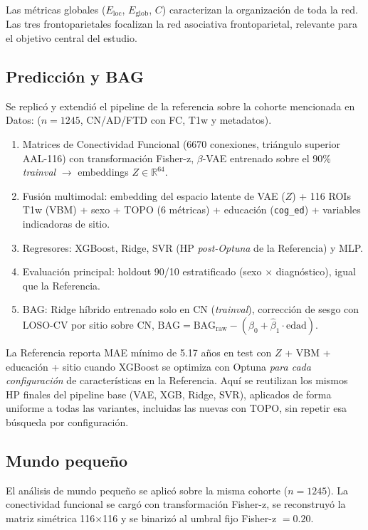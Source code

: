 \documentclass[12pt,a4paper]{article}
\begin{document}
Las métricas globales ($E_{\text{loc}}$, $E_{\text{glob}}$, $C$) caracterizan la organización de toda la red. Las tres frontoparietales focalizan la red asociativa frontoparietal, relevante para el objetivo central del estudio.

\subsection{Predicción y BAG}

Se replicó y extendió el pipeline de la referencia\cite{bazan2026} sobre la cohorte mencionada en Datos: ($n = 1245$, CN/AD/FTD con FC, T1w y metadatos).

\begin{enumerate}
  \item Matrices de Conectividad Funcional (6670 conexiones, triángulo superior AAL-116\cite{tzourio2002}) con transformación Fisher-z, $\beta$-VAE\cite{higgins2022} entrenado sobre el 90\% \emph{trainval} $\rightarrow$ embeddings $Z \in \mathbb{R}^{64}$.
  \item Fusión multimodal: embedding del espacio latente de VAE ($Z$) + 116 ROIs T1w (VBM) + sexo + TOPO (6 métricas) + educación (\texttt{cog\_ed}) + variables indicadoras de sitio.
  \item Regresores: XGBoost, Ridge, SVR (HP \emph{post-Optuna} de la Referencia) y MLP.
  \item Evaluación principal: holdout 90/10 estratificado (sexo $\times$ diagnóstico), igual que la Referencia.
  \item BAG: Ridge híbrido entrenado solo en CN (\emph{trainval}), corrección de sesgo con LOSO-CV
        por sitio sobre CN, $\text{BAG} = \text{BAG}_{\text{raw}} - (\hat{\beta}_0 + \hat{\beta}_1 \cdot \text{edad})$.
\end{enumerate}

La Referencia reporta MAE mínimo de 5.17 años en test con $Z$ + VBM + educación + sitio cuando
XGBoost se optimiza con Optuna \emph{para cada configuración} de características en la Referencia.
Aquí se reutilizan los mismos HP finales del pipeline base (VAE, XGB, Ridge, SVR), aplicados de forma uniforme a todas las variantes, incluidas las nuevas con TOPO, sin repetir esa búsqueda por configuración.

\subsection{Mundo pequeño}

El análisis de mundo pequeño se aplicó sobre la misma cohorte ($n = 1245$). La conectividad funcional se cargó con transformación Fisher-z, se reconstruyó la matriz simétrica 116$\times$116 y se binarizó al umbral fijo Fisher-z $= 0.20$.
\end{document}
